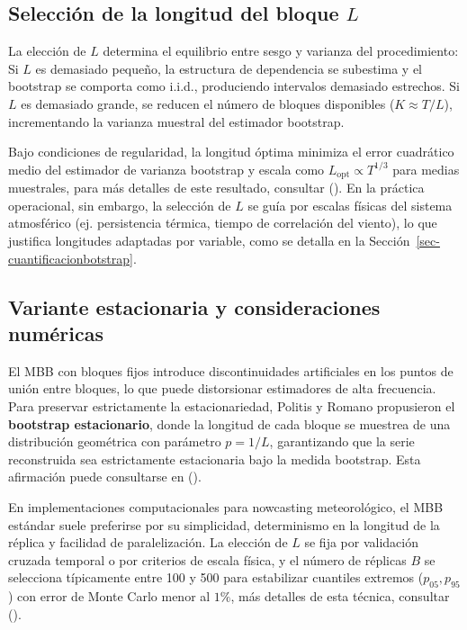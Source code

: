 \documentclass[
  spanish,
  us-letterpaper,
]{scrreprt}
\numberwithin{equation}{section}
\begin{document}
\subsection{\texorpdfstring{Selección de la longitud del bloque
\(L\)}{Selección de la longitud del bloque L}}\label{selecciuxf3n-de-la-longitud-del-bloque-l}

La elección de \(L\) determina el equilibrio entre sesgo y varianza del
procedimiento: Si \(L\) es demasiado pequeño, la estructura de
dependencia se subestima y el bootstrap se comporta como i.i.d.,
produciendo intervalos demasiado estrechos. Si \(L\) es demasiado
grande, se reducen el número de bloques disponibles (\(K \approx T/L\)),
incrementando la varianza muestral del estimador bootstrap.

Bajo condiciones de regularidad, la longitud óptima minimiza el error
cuadrático medio del estimador de varianza bootstrap y escala como
\(L_{\text{opt}} \propto T^{1/3}\) para medias muestrales, para más
detalles de este resultado, consultar
(). En la
práctica operacional, sin embargo, la selección de \(L\) se guía por
escalas físicas del sistema atmosférico (ej. persistencia térmica,
tiempo de correlación del viento), lo que justifica longitudes adaptadas
por variable, como se detalla en la
Sección~\ref{sec-cuantificacionbotstrap}.

\subsection{Variante estacionaria y consideraciones
numéricas}\label{variante-estacionaria-y-consideraciones-numuxe9ricas}

El MBB con bloques fijos introduce discontinuidades artificiales en los
puntos de unión entre bloques, lo que puede distorsionar estimadores de
alta frecuencia. Para preservar estrictamente la estacionariedad,
Politis y Romano propusieron el \textbf{bootstrap estacionario}, donde
la longitud de cada bloque se muestrea de una distribución geométrica
con parámetro \(p = 1/L\), garantizando que la serie reconstruida sea
estrictamente estacionaria bajo la medida bootstrap. Esta afirmación
puede consultarse en ().

En implementaciones computacionales para nowcasting meteorológico, el
MBB estándar suele preferirse por su simplicidad, determinismo en la
longitud de la réplica y facilidad de paralelización. La elección de
\(L\) se fija por validación cruzada temporal o por criterios de escala
física, y el número de réplicas \(B\) se selecciona típicamente entre
100 y 500 para estabilizar cuantiles extremos (\(p_{05}, p_{95}\)) con
error de Monte Carlo menor al \(1\%\), más detalles de esta técnica,
consultar ().
\end{document}
